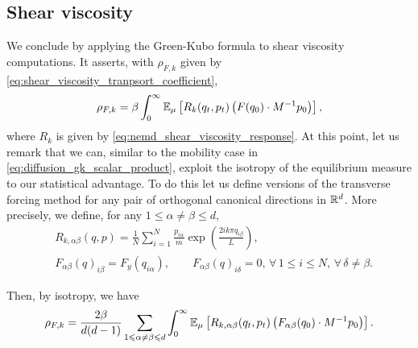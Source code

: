 \subsection{Shear viscosity}
We conclude by applying the Green-Kubo formula to shear viscosity computations. It asserts, with $\rho_{F,k}$ given by \eqref{eq:shear_viscosity_tranpsort_coefficient},
\begin{equation}
    \label{eq:green_kubo_viscosity}
    \rho_{F,k}=\beta\int_0^\infty \mathbb{E}_\mu\left[R_k(q_t,p_t)\left(F(q_0)\cdot M^{-1}p_0\right)\right],
\end{equation}
where $R_k$ is given by \eqref{eq:nemd_shear_viscosity_response}.
At this point, let us remark that we can, similar to the mobility case in \eqref{eq:diffusion_gk_scalar_product}, exploit the isotropy of the equilibrium measure to our statistical advantage.
To do this let us define versions of the transverse forcing method for any pair of orthogonal canonical directions in $\mathbb{R}^d$. More precisely,
we define, for any $1\leq \alpha \neq \beta \leq d$,
\begin{align*}
    &R_{k,\alpha\beta}(q,p)=\frac{1}N\sum_{i=1}^N\frac{p_{i\alpha}}{m}\exp\left(\frac{2ik\pi q_{i\beta}}{L}\right),\\
    &F_{\alpha\beta}(q)_{i\beta}=F_y(q_{i\alpha}),\qquad F_{\alpha\beta}(q)_{i\delta}=0,\,\forall\, 1\leq i\leq N,\, \forall\, \delta \neq \beta.
\end{align*}

Then, by isotropy, we have
\begin{equation}
    \label{eq:green_kubo_viscosity}
    \rho_{F,k}=\frac{2\beta}{d(d-1)}\sum_{1\leqslant \alpha\neq\beta \leqslant d}\int_0^\infty\mathbb{E}_\mu\left[R_{k,\alpha\beta}(q_t,p_t)\left(F_{\alpha\beta}(q_0)\cdot M^{-1}p_0\right)\right].
\end{equation}

